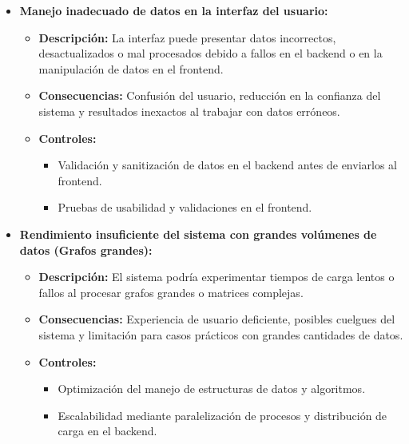 \documentclass[stu, 12pt, letterpaper, donotrepeattitle, floatsintext, natbib]{apa7}
\begin{document}
\begin{itemize}
    \item \textbf{Manejo inadecuado de datos en la interfaz del usuario:} 
    \begin{itemize}
        \item \textbf{Descripción:} La interfaz puede presentar datos incorrectos, desactualizados o mal procesados debido a fallos en el backend o en la manipulación de datos en el frontend.
        \item \textbf{Consecuencias:} Confusión del usuario, reducción en la confianza del sistema y resultados inexactos al trabajar con datos erróneos.
        \item \textbf{Controles:} 
        \begin{itemize}
            \item Validación y sanitización de datos en el backend antes de enviarlos al frontend.
            \item Pruebas de usabilidad y validaciones en el frontend.
        \end{itemize}
    \end{itemize}

    \item \textbf{Rendimiento insuficiente del sistema con grandes volúmenes de datos (Grafos grandes):} 
    \begin{itemize}
        \item \textbf{Descripción:} El sistema podría experimentar tiempos de carga lentos o fallos al procesar grafos grandes o matrices complejas.
        \item \textbf{Consecuencias:} Experiencia de usuario deficiente, posibles cuelgues del sistema y limitación para casos prácticos con grandes cantidades de datos.
        \item \textbf{Controles:} 
        \begin{itemize}
            \item Optimización del manejo de estructuras de datos y algoritmos.
            \item Escalabilidad mediante paralelización de procesos y distribución de carga en el backend.
        \end{itemize}
    \end{itemize}


\end{itemize}
\end{document}
